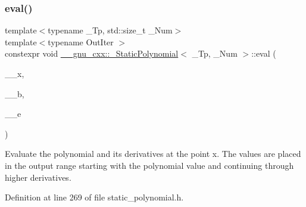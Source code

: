 \subsubsection{\texorpdfstring{eval()}{eval()}\hspace{0.1cm}{\footnotesize\ttfamily [2/2]}}
{\footnotesize\ttfamily template$<$typename \+\_\+\+Tp, std\+::size\+\_\+t \+\_\+\+Num$>$ \\
template$<$typename Out\+Iter $>$ \\
constexpr void \hyperlink{class____gnu__cxx_1_1__StaticPolynomial}{\+\_\+\+\_\+gnu\+\_\+cxx\+::\+\_\+\+Static\+Polynomial}$<$ \+\_\+\+Tp, \+\_\+\+Num $>$\+::eval (\begin{DoxyParamCaption}\item[{\hyperlink{class____gnu__cxx_1_1__StaticPolynomial_af23110f5a002cd6caa3542df7cf35284}{value\+\_\+type}}]{\+\_\+\+\_\+x,  }\item[{Out\+Iter}]{\+\_\+\+\_\+b,  }\item[{Out\+Iter}]{\+\_\+\+\_\+e }\end{DoxyParamCaption})\hspace{0.3cm}{\ttfamily [inline]}}

Evaluate the polynomial and its derivatives at the point x. The values are placed in the output range starting with the polynomial value and continuing through higher derivatives. 

Definition at line 269 of file static\+\_\+polynomial.\+h.


